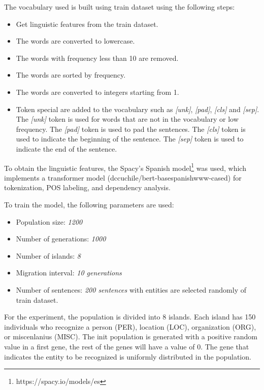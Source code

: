 The vocabulary used is built using train dataset using the following steps:
\begin{itemize}
  \item Get linguistic features from the train dataset.
  \item The words are converted to lowercase.
  \item The words with frequency less than 10 are removed.
  \item The words are sorted by frequency.
  \item The words are converted to integers starting from 1.
  \item Token special are added to the vocabulary such as \textit{[unk]},  \textit{[pad]}, \textit{[cls]} and \textit{[sep]}. The \textit{[unk]} token is used for words that are not in the vocabulary or low frequency. The \textit{[pad]} token is used to pad the sentences. The \textit{[cls]} token is used to indicate the beginning of the sentence. The \textit{[sep]} token is used to indicate the end of the sentence.
\end{itemize}

To obtain the linguistic features, the Spacy's Spanish model\footnote{https://spacy.io/models/es} was used, which implements a transformer model (dccuchile/bert\--base\-spanish\-www\--cased) for tokenization, POS labeling, and dependency analysis.

To train the model, the following parameters are used:
\begin{itemize}
  \item Population size: \textit{1200}
  \item Number of generations: \textit{1000}
  \item Number of islands: \textit{8}
  \item Migration interval: \textit{10 generations}
  \item Number of sentences: \textit{200 sentences} with entities are selected randomly of train dataset.
\end{itemize}



For the experiment, the population is divided into 8 islands. Each island has 150 individuals who recognize a person (PER), location (LOC), organization (ORG), or miscenlanius (MISC). The init population is generated with a positive random value in a first gene, the rest of the genes will have a value of 0. The gene that indicates the entity to be recognized is uniformly distributed in the population.

